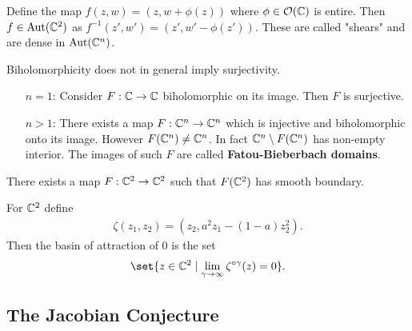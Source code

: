 \begin{example}
    Define the map $f(z,w) = (z, w + \phi(z))$ where $\phi \in \mathcal{O}(\mathbb{C})$ is entire. Then $f \in \operatorname{Aut}(\mathbb{C}^2) $ as $f^{-1}(z',w')  = (z' , w' - \phi(z'))$. These are called "shears" and are dense in $\operatorname{Aut}(\mathbb{C}^n)$.
\end{example}

\begin{remark}
    Biholomorphicity does not in general imply surjectivity.
    \begin{itemize}
        \item[$n=1$:] Consider $F : \mathbb{C} \to \mathbb{C}$ biholomorphic on its image. Then $F$ is surjective.
        \item[$n>1$:] There exists a map $F : \mathbb{C}^n \to \mathbb{C}^n$ which is injective and biholomorphic onto its image. However $F(\mathbb{C}^n) \neq \mathbb{C}^n$. In fact $\mathbb{C}^n \setminus F(\mathbb{C}^n)$ has non-empty interior. The images of such $F$ are called \textbf{Fatou-Bieberbach domains}.
    \end{itemize}
\end{remark}

\begin{proposition}[Stensones, 2000]
    There exists a map $F : \mathbb{C}^2 \to \mathbb{C}^2$ such that $F(\mathbb{C}^2) $ has smooth boundary.
\end{proposition}

\begin{note}
    For $\mathbb{C}^2$ define
    \begin{align*}
        \zeta(z_1 , z_2) = (z_2 , a^2 z_1 - (1-a) z_2^2 ).
    \end{align*}
    Then the basin of attraction of $0$ is the set
    \begin{align*}
       \set{ z \in \C^2 \mid \lim_{\gamma \to \infty} \zeta^{\circ \gamma} (z) = 0 }. 
    \end{align*}
\end{note}

\subsection{The Jacobian Conjecture}

